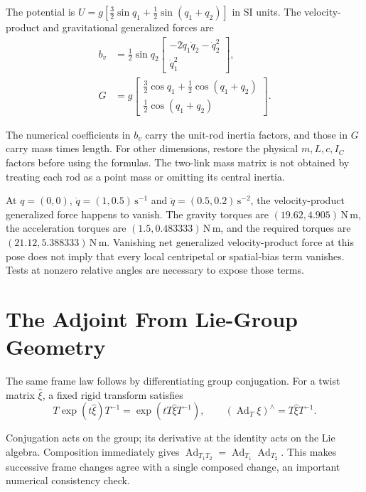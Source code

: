 The potential is $U=g[\tfrac32\sin q_1+\tfrac12\sin(q_1+q_2)]$ in SI units. The velocity-product and gravitational generalized forces are
\begin{equation}
 \begin{aligned}
 b_v&=\tfrac12\sin q_2
 \begin{bmatrix}-2\dot q_1\dot q_2-\dot q_2^2\\\dot q_1^2\end{bmatrix},\\
 G&=g\begin{bmatrix}\tfrac32\cos q_1+\tfrac12\cos(q_1+q_2)\\
 \tfrac12\cos(q_1+q_2)\end{bmatrix}.
 \end{aligned}
 \label{eq:rnea_two_rod_bias}
\end{equation}

The numerical coefficients in $b_v$ carry the unit-rod inertia factors, and those in $G$ carry mass times length. For other dimensions, restore the physical $m,L,c,I_C$ factors before using the formulas. The two-link mass matrix is not obtained by treating each rod as a point mass or omitting its central inertia.

At $q=(0,0)$, $\dot q=(1,0.5)\,\mathrm{s^{-1}}$ and $\ddot q=(0.5,0.2)\,\mathrm{s^{-2}}$, the velocity-product generalized force happens to vanish. The gravity torques are $(19.62,4.905)\,\mathrm{N\,m}$, the acceleration torques are $(1.5,0.483333)\,\mathrm{N\,m}$, and the required torques are $(21.12,5.388333)\,\mathrm{N\,m}$. Vanishing net generalized velocity-product force at this pose does not imply that every local centripetal or spatial-bias term vanishes. Tests at nonzero relative angles are necessary to expose those terms.

\section{The Adjoint From Lie-Group Geometry}
\label{sec:adjoint_derivation}

The same frame law follows by differentiating group conjugation. For a twist matrix $\widehat\xi$, a fixed rigid transform satisfies
\begin{equation}
 T\exp(t\widehat\xi)T^{-1}
 =\exp(tT\widehat\xi T^{-1}),\qquad
 (\operatorname{Ad}_T\xi)^{\wedge}=T\widehat\xi T^{-1}.
 \label{eq:rnea_adjoint_conjugation}
\end{equation}

Conjugation acts on the group; its derivative at the identity acts on the Lie algebra. Composition immediately gives $\operatorname{Ad}_{T_1T_2}=\operatorname{Ad}_{T_1}\operatorname{Ad}_{T_2}$. This makes successive frame changes agree with a single composed change, an important numerical consistency check.

